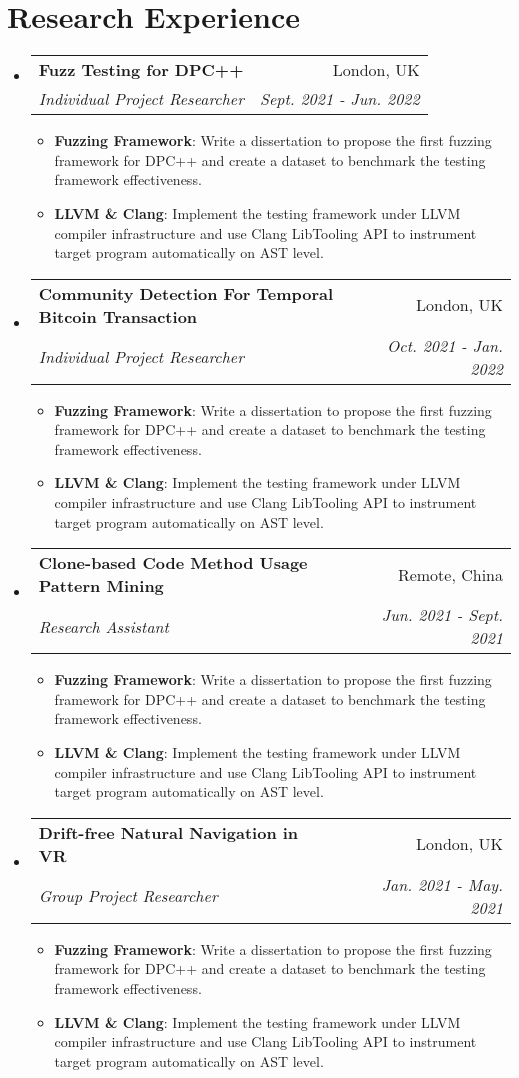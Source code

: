 \documentclass[letterpaper,11pt]{article}
\makeatletter
\newcommand{\resumeItem}[2]{
  \item\small{
    \textbf{#1}{: #2 \vspace{-2pt}}
  }
}
\newcommand{\resumeSubheading}[4]{
  \vspace{-1pt}\item
    \begin{tabular*}{0.97\textwidth}[t]{l@{\extracolsep{\fill}}r}
      \textbf{#1} & #2 \\
      \textit{\small#3} & \textit{\small #4} \\
    \end{tabular*}\vspace{-5pt}
}
\newcommand{\resumeSubHeadingListStart}{\begin{itemize}[leftmargin=*]}
\newcommand{\resumeSubHeadingListEnd}{\end{itemize}}
\newcommand{\resumeItemListStart}{\begin{itemize}}
\newcommand{\resumeItemListEnd}{\end{itemize}\vspace{-5pt}}
\makeatother
\begin{document}
\section{Research Experience}
  \resumeSubHeadingListStart
    \resumeSubheading
    {Fuzz Testing for DPC++}{London, UK}
    {Individual Project Researcher}{Sept. 2021 - Jun. 2022}
    \resumeItemListStart
      \resumeItem{Fuzzing Framework}
          {Write a dissertation to propose the first fuzzing framework for DPC++ and create a dataset to benchmark the testing framework effectiveness.}
      \resumeItem{LLVM \& Clang}
          {Implement the testing framework under LLVM compiler infrastructure and use Clang LibTooling API to instrument target program automatically on AST level.}
    \resumeItemListEnd
    \resumeSubheading
    {Community Detection For Temporal Bitcoin Transaction}{London, UK}
    {Individual Project Researcher}{Oct. 2021 - Jan. 2022}
    \resumeItemListStart
      \resumeItem{Fuzzing Framework}
          {Write a dissertation to propose the first fuzzing framework for DPC++ and create a dataset to benchmark the testing framework effectiveness.}
      \resumeItem{LLVM \& Clang}
          {Implement the testing framework under LLVM compiler infrastructure and use Clang LibTooling API to instrument target program automatically on AST level.}
    \resumeItemListEnd
    \resumeSubheading
    {Clone-based Code Method Usage Pattern Mining}{Remote, China}
    {Research Assistant}{Jun. 2021 - Sept. 2021}
    \resumeItemListStart
      \resumeItem{Fuzzing Framework}
          {Write a dissertation to propose the first fuzzing framework for DPC++ and create a dataset to benchmark the testing framework effectiveness.}
      \resumeItem{LLVM \& Clang}
          {Implement the testing framework under LLVM compiler infrastructure and use Clang LibTooling API to instrument target program automatically on AST level.}
    \resumeItemListEnd
    \resumeSubheading
    {Drift-free Natural Navigation in VR}{London, UK}
    {Group Project Researcher}{Jan. 2021 - May. 2021 }
    \resumeItemListStart
      \resumeItem{Fuzzing Framework}
          {Write a dissertation to propose the first fuzzing framework for DPC++ and create a dataset to benchmark the testing framework effectiveness.}
      \resumeItem{LLVM \& Clang}
          {Implement the testing framework under LLVM compiler infrastructure and use Clang LibTooling API to instrument target program automatically on AST level.}
    \resumeItemListEnd

  \resumeSubHeadingListEnd
\end{document}
